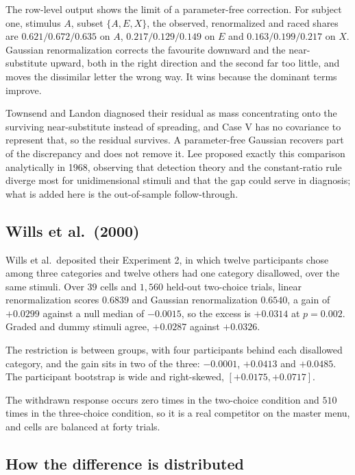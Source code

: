 \documentclass[11pt]{article}
\begin{document}
The row-level output shows the limit of a parameter-free correction. For subject
one, stimulus $A$, subset $\{A,E,X\}$, the observed, renormalized and raced shares are
$0.621 / 0.672 / 0.635$ on $A$, $0.217 / 0.129 / 0.149$ on $E$ and $0.163 / 0.199 / 0.217$
on $X$. Gaussian renormalization corrects the favourite downward and the near-substitute upward, both in the
right direction and the second far too little, and moves the dissimilar letter the wrong way.
It wins because the dominant terms improve.

Townsend and Landon diagnosed their residual as
mass concentrating onto the surviving near-substitute instead of spreading, and Case V has no
covariance to represent that, so the residual survives. A parameter-free Gaussian recovers
part of the discrepancy and does not remove it. Lee \cite{lee1968} proposed exactly this comparison analytically in 1968,
observing that detection theory and the constant-ratio rule diverge most for unidimensional
stimuli and that the gap could serve in diagnosis; what is added here is the out-of-sample
follow-through.

\subsection*{Wills et al.\ (2000)}

Wills et al.\ deposited their Experiment 2, in which twelve participants chose among three
categories and twelve others had one category disallowed, over the same stimuli. Over $39$
cells and $1{,}560$ held-out two-choice trials, linear renormalization scores $0.6839$ and Gaussian renormalization
$0.6540$, a gain of $+0.0299$ against a null median of $-0.0015$, so the excess is $+0.0314$
at $p = 0.002$. Graded and dummy stimuli agree, $+0.0287$ against $+0.0326$.

The restriction is between groups, with four participants behind each disallowed category, and
the gain sits in two of the three: $-0.0001$, $+0.0413$ and $+0.0485$. The participant
bootstrap is wide and right-skewed, $[+0.0175, +0.0717]$.

The withdrawn response occurs zero times in the two-choice condition and $510$ times in the
three-choice condition, so it is a real competitor on the master menu, and cells are balanced
at forty trials.

\subsection{How the difference is distributed}
\label{sec:distribution}
\end{document}

